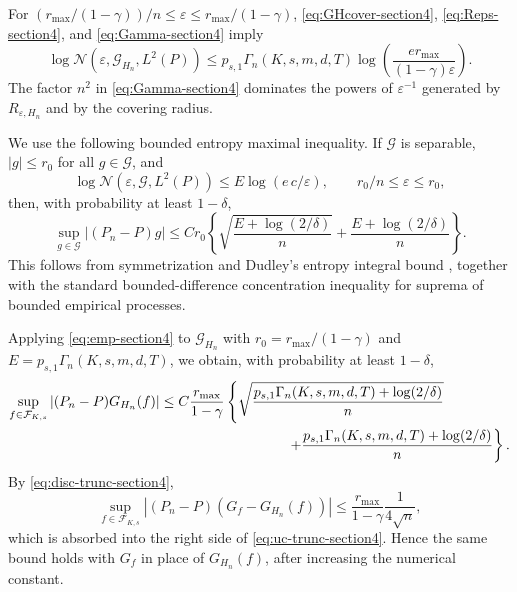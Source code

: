 \documentclass{article}
\newcommand{\1}{\mathbbm{1}}
\numberwithin{equation}{section}
\begin{document}
For \((r_{\max}/(1-\gamma))/n\le\varepsilon\le r_{\max}/(1-\gamma)\), \eqref{eq:GHcover-section4}, \eqref{eq:Reps-section4}, and \eqref{eq:Gamma-section4} imply
\begin{equation}
\label{eq:entropy-final-section4}
 \log \mathcal N(\varepsilon,\mathcal G_{H_n},L^2(P))
 \le
 p_{s,1}\Gamma_n(K,s,m,d,T)
 \log\left(\frac{er_{\max}}{(1-\gamma)\varepsilon}\right).
\end{equation}
The factor \(n^2\) in \eqref{eq:Gamma-section4} dominates the powers of \(\varepsilon^{-1}\) generated by \(R_{\varepsilon,H_n}\) and by the covering radius.








We use the following bounded entropy maximal inequality. If \(\mathcal G\) is separable, \(|g|\le r_0\) for all \(g\in\mathcal G\), and
\[
 \log \mathcal N(\varepsilon,\mathcal G,L^2(P))\le E\log(e\,c/\varepsilon),
 \qquad r_0/n\le\varepsilon\le r_0,
\]
then, with probability at least \(1-\delta\),
\begin{equation}
\label{eq:emp-section4}
 \sup_{g\in\mathcal G}|(P_n-P)g|
 \le
 C r_0\left\{
 \sqrt{\frac{E+\log(2/\delta)}{n}}
 +\frac{E+\log(2/\delta)}{n}
 \right\}.
\end{equation}
This follows from symmetrization and Dudley's entropy integral bound
\cite[Theorem~5.22]{wainwright2019high}, together with the standard
bounded-difference concentration inequality for suprema of bounded
empirical processes.

Applying \eqref{eq:emp-section4} to \(\mathcal G_{H_n}\) with \(r_0=r_{\max}/(1-\gamma)\) and \(E=p_{s,1}\Gamma_n(K,s,m,d,T)\), we obtain, with probability at least \(1-\delta\),
\begin{align}
\label{eq:uc-trunc-section4}
 \sup_{f\in\mathcal F_{K,s}}|(P_n-P)G_{H_n}(f)|
 &\le
 C\frac{r_{\max}}{1-\gamma}
 \left\{
 \sqrt{\frac{p_{s,1}\Gamma_n(K,s,m,d,T)+\log(2/\delta)}{n}}
 \right.
\notag\\
 &\hspace{3.2cm}\left.
 +\frac{p_{s,1}\Gamma_n(K,s,m,d,T)+\log(2/\delta)}{n}
 \right\}.
\end{align}
By \eqref{eq:disc-trunc-section4},
\[
 \sup_{f\in\mathcal F_{K,s}}
 |(P_n-P)(G_f-G_{H_n}(f))|
 \le
 \frac{r_{\max}}{1-\gamma}\frac1{4\sqrt n},
\]
which is absorbed into the right side of \eqref{eq:uc-trunc-section4}. Hence the same bound holds with \(G_f\) in place of \(G_{H_n}(f)\), after increasing the numerical constant.
\end{document}
